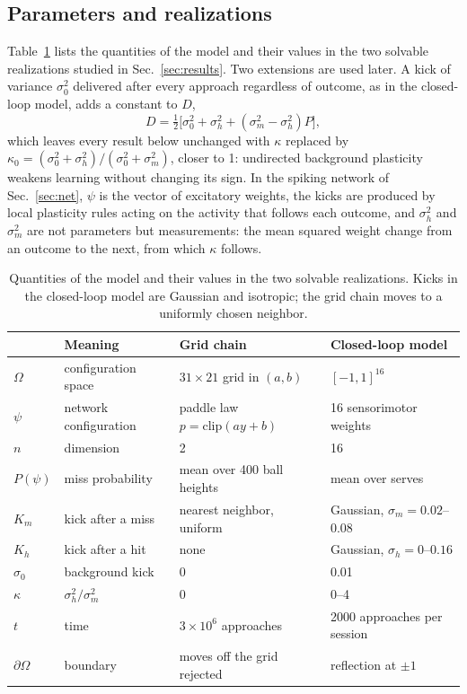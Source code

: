 \documentclass[pre,twocolumn,superscriptaddress,showpacs=false,amsmath,amssymb,nofootinbib]{revtex4-2}
\begin{document}
\subsection{Parameters and realizations}
Table~\ref{tab:params} lists the quantities of the model and their values in the two solvable realizations studied in Sec.~\ref{sec:results}. Two extensions are used later. A kick of variance $\sigma_0^2$ delivered after every approach regardless of outcome, as in the closed-loop model, adds a constant to $D$,
\begin{equation}
D=\tfrac12\bigl[\sigma_0^2+\sigma_h^2+(\sigma_m^2-\sigma_h^2)P\bigr],
\label{eq:D0}
\end{equation}
which leaves every result below unchanged with $\kappa$ replaced by $\kappa_0=(\sigma_0^2+\sigma_h^2)/(\sigma_0^2+\sigma_m^2)$, closer to 1: undirected background plasticity weakens learning without changing its sign. In the spiking network of Sec.~\ref{sec:net}, $\psi$ is the vector of excitatory weights, the kicks are produced by local plasticity rules acting on the activity that follows each outcome, and $\sigma_h^2$ and $\sigma_m^2$ are not parameters but measurements: the mean squared weight change from an outcome to the next, from which $\kappa$ follows.

\begin{table}[b]
\caption{Quantities of the model and their values in the two solvable realizations. Kicks in the closed-loop model are Gaussian and isotropic; the grid chain moves to a uniformly chosen neighbor.}
\label{tab:params}
\footnotesize
\begin{ruledtabular}
\begin{tabular}{@{}lp{1.9cm}p{2.2cm}p{2.4cm}@{}}
 & Meaning & Grid chain & Closed-loop model \\
\hline
$\Omega$ & configuration space & $31\times21$ grid in $(a,b)$ & $[-1,1]^{16}$ \\
$\psi$ & network configuration & paddle law $p=\mathrm{clip}(ay+b)$ & 16 sensorimotor weights \\
$n$ & dimension & 2 & 16 \\
$P(\psi)$ & miss probability & mean over 400 ball heights & mean over serves \\
$K_m$ & kick after a miss & nearest neighbor, uniform & Gaussian, $\sigma_m=0.02$--$0.08$ \\
$K_h$ & kick after a hit & none & Gaussian, $\sigma_h=0$--$0.16$ \\
$\sigma_0$ & background kick & 0 & 0.01 \\
$\kappa$ & $\sigma_h^2/\sigma_m^2$ & 0 & 0--4 \\
$t$ & time & $3\times10^6$ approaches & 2000 approaches per session \\
$\partial\Omega$ & boundary & moves off the grid rejected & reflection at $\pm1$ \\
\end{tabular}
\end{ruledtabular}
\end{table}
\end{document}
